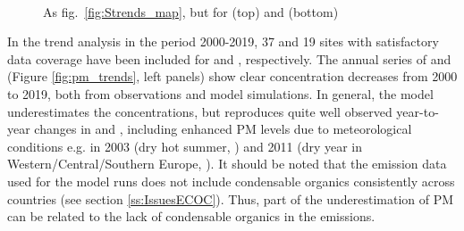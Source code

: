 \begin{figure}  %
  \\
\caption{As fig.~\ref{fig:Strends_map}, but for \pmten (top) and \pmfine (bottom)
\label{fig:PMtrends}}
\end{figure}


In the trend analysis in the period 2000-2019, 37 and 19 sites with satisfactory data coverage have been included for \PM[10] and \PM[2.5], respectively. The annual series of \PM[10] and \PM[2.5] (Figure \ref{fig:pm_trends}, left panels) show clear concentration decreases from 2000 to 2019, both from observations and model simulations. In general, the model underestimates the concentrations, but reproduces quite well observed year-to-year changes in \PM[10] and \PM[2.5], including enhanced PM levels due to meteorological conditions e.g. in 2003 (dry hot summer, \citealt{EMEP:PM2005}) and 2011 (dry year in Western/Central/Southern Europe, \citealt{EMEP:PM2013}). It should be noted that the emission data used for the model runs does not include condensable organics consistently across countries (see section \ref{ss:IssuesECOC}). Thus, part of the underestimation of PM can be related to the lack of condensable organics in the emissions. 

